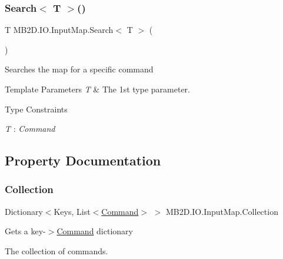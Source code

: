 \subsubsection{\texorpdfstring{Search$<$ T $>$()}{Search< T >()}}
{\footnotesize\ttfamily T M\+B2\+D.\+I\+O.\+Input\+Map.\+Search$<$ T $>$ (\begin{DoxyParamCaption}{ }\end{DoxyParamCaption})\hspace{0.3cm}{\ttfamily [inline]}}



Searches the map for a specific command 


\begin{DoxyTemplParams}{Template Parameters}
{\em T} & The 1st type parameter.\\
\hline
\end{DoxyTemplParams}
\begin{Desc}
\item[Type Constraints]\begin{description}
\item[{\em T} : {\em Command}]\end{description}
\end{Desc}


\subsection{Property Documentation}
\hypertarget{class_m_b2_d_1_1_i_o_1_1_input_map_a16a798fd9e5c599591620b52c5eb8a55}{}\label{class_m_b2_d_1_1_i_o_1_1_input_map_a16a798fd9e5c599591620b52c5eb8a55} 
\subsubsection{\texorpdfstring{Collection}{Collection}}
{\footnotesize\ttfamily Dictionary$<$Keys, List$<$\hyperlink{class_m_b2_d_1_1_i_o_1_1_command}{Command}$>$ $>$ M\+B2\+D.\+I\+O.\+Input\+Map.\+Collection\hspace{0.3cm}{\ttfamily [get]}}



Gets a key-\/$>$\hyperlink{class_m_b2_d_1_1_i_o_1_1_command}{Command} dictionary 

The collection of commands.\hypertarget{class_m_b2_d_1_1_i_o_1_1_input_map_ad78e010b598d32be8fbd1b30c41b7ee0}{}\label{class_m_b2_d_1_1_i_o_1_1_input_map_ad78e010b598d32be8fbd1b30c41b7ee0} 
